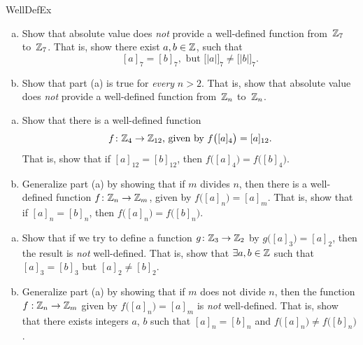 \begin{exercise}{WellDefEx}
\begin{enumerate}[(a)]
\item  \label{WellDefEx-AbsVal0}
 Show that absolute value does \emph{not} provide a well-defined function from~$\mathbb{Z}_7$ to~$\mathbb{Z}_7$. That is, show there exist $a,b \in \mathbb{Z}$, such that $$[a]_7 = [b]_7, \text{ but } \bigl[ |a| \bigr]_7 \neq \bigl[ |b| \bigr]_7.$$
\item  \label{WellDefEx-AbsVal}
 Show that part (a) is true for \emph{every} $n > 2$. That is, show that  absolute value does \emph{not} provide a well-defined function from~$\mathbb{Z}_n$ to~$\mathbb{Z}_n$. 
\end{enumerate}
\end{exercise}

\begin{exercise}{57}
\begin{enumerate}[(a)]
\item
Show that there is a well-defined function 
	$$ \text{$f \colon \mathbb{Z}_4 \to \mathbb{Z}_{12}$, given by $f \bigl( [a]_4 \bigr) = [a]_{12}$.} $$
That is, show that if $[a]_{12} = [b]_{12}$, then $f \bigl( [a]_4 \bigr) = f \bigl( [b]_4 \bigr)$.
\item  \label{WellDefEx-divide}
Generalize part (a) by showing that if $m$ divides $n$, then there is a well-defined function 
$f \colon \mathbb{Z}_n \to \mathbb{Z}_m$, given by $f \bigl( [a]_n \bigr) = [a]_m$.
That is, show that if $[a]_n = [b]_n$, then $f \bigl( [a]_n \bigr) = f \bigl( [b]_n \bigr)$.
\end{enumerate}
\end{exercise}

\begin{exercise}{}
\begin{enumerate}[(a)]
\item  \label{WellDefEx-odd2}
 Show that if we try to define a function $g \colon \mathbb{Z}_3 \to \mathbb{Z}_2$ by $g \bigl( [a]_3 \bigr) = [a]_2$, then the result is \emph{not} well-defined. That is, show that $\exists a, b \in \mathbb{Z}$ such that
$[a]_3 = [b]_3$  but $[a]_2 \neq [b]_2.$
\item
Generalize part (a) by showing that 
if $m$ does not divide $n$, then the function 
$f: \mathbb{Z}_n \to \mathbb{Z}_m$  given by $f \bigl( [a]_n \bigr) = [a]_m$ is \emph{not} well-defined.
That is, show that there exists integers $a$, $b$ such that $[a]_n = [b]_n$ and $f \bigl( [a]_n \bigr) \neq f \bigl( [b]_n \bigr)$.
\end{enumerate}
\end{exercise}


